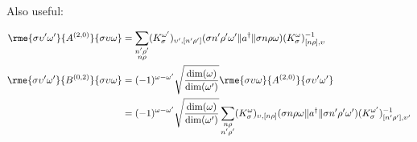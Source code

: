 \documentclass[%
  aps,%
  prc,%
  showpacs,%
  superscriptaddress,%
  onecolumn,%
  notitlepage,%
  11pt,%
  floatfix,%
  amsmath,%
  amssymb,%
]{revtex4-2}
\begin{document}
Also useful:

\begin{align*}
  \rme{\sigma \upsilon'\omega'}{A^{(2,0)}}{\sigma \upsilon \omega}
    &= \sum_{\substack{n'\rho'\\ n \rho}} (K_\sigma^{\omega'})_{\upsilon',[n'\rho']} (\sigma n'\rho'\omega'\Vert a^\dagger \Vert \sigma n \rho \omega) (K_\sigma^\omega)_{[n \rho],\upsilon}^{-1}\\
  \rme{\sigma \upsilon'\omega'}{B^{(0,2)}}{\sigma \upsilon \omega}
    &= (-1)^{\omega-\omega'} \sqrt{\frac{\dim(\omega)}{\dim(\omega')}} \rme{\sigma \upsilon \omega}{A^{(2,0)}}{\sigma \upsilon'\omega'}\\
    &= (-1)^{\omega-\omega'} \sqrt{\frac{\dim(\omega)}{\dim(\omega')}} \sum_{\substack{n \rho \\ n'\rho'}} (K_\sigma^{\omega})_{\upsilon,[n\rho]} (\sigma n \rho \omega \Vert a^\dagger \Vert \sigma n'\rho'\omega') (K_\sigma^{\omega'})_{[n'\rho'],\upsilon'}^{-1}
\end{align*}
\clearpage
\end{document}
